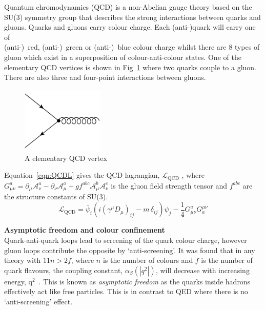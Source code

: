 Quantum chromodynamics (QCD) is a non-Abelian gauge theory based on the SU(3) symmetry group that describes the strong interactions between quarks and gluons. Quarks and gluons carry colour charge. Each (anti-)quark will carry one of \\(anti-)~red, (anti-)~green or (anti-)~blue colour charge whilst there are 8 types of gluon which exist in a superposition of colour-anti-colour states. One of the elementary QCD vertices is shown in Fig~\ref{fig:QCDvertex} where two quarks couple to a gluon. There are also three and four-point interactions between gluons.
\label{subsec:QCD}
\begin{figure}[ht!]
\begin{center}
    \includegraphics[width=0.35\textwidth]{images/Theory/QCDvertex.png}
    \caption{A elementary QCD vertex}
    \label{fig:QCDvertex}
\end{center}
\end{figure}


Equation~\ref{eqn:QCDL} gives the QCD lagrangian, $\mathcal{L}_{\textrm {QCD}}$ , where $G_{\mu \nu }^{a}=\partial _{\mu }{\mathcal {A}}_{\nu }^{a}-\partial _{\nu }{\mathcal {A}}_{\mu }^{a}+gf^{abc}{\mathcal {A}}_{\mu }^{b}{\mathcal {A}}_{\nu }^{c}$ is the gluon field strength tensor and $f^{abc}$ are the structure constants of SU(3).
\begin{equation}
    \label{eqn:QCDL}
{\mathcal {L}}_{\mathrm {QCD} }={\bar {\psi }}_{i}\left(i(\gamma ^{\mu }D_{\mu })_{ij}-m\,\delta _{ij}\right)\psi _{j}-{\frac {1}{4}}G_{\mu \nu }^{a}G_{a}^{\mu \nu }
\end{equation}

\textbf{Asymptotic freedom and colour confinement}\\
Quark-anti-quark loops lead to screening of the quark colour charge, however gluon loops contribute the opposite by `anti-screening'. It was found that in any theory with $11n>2f$, where $n$ is the number of colours and $f$ is the number of quark flavours, the coupling constant, $\alpha_{S}\left( |q^{2}| \right)$, will decrease with increasing energy, q$^{2}$~\cite{PhysRevLett.30.1343,PhysRevLett.30.1346}. This is known as \emph{asymptotic freedom} as the quarks inside hadrons effectively act like free particles. This is in contrast to QED where there is no `anti-screening' effect.

